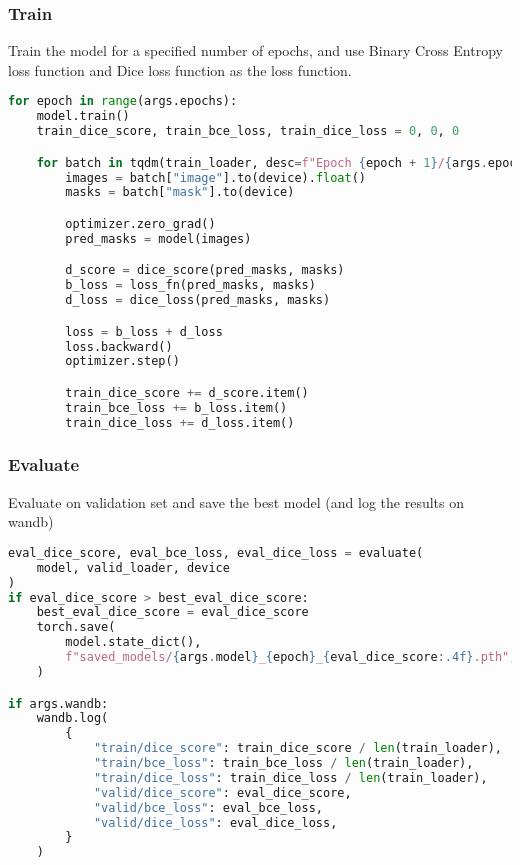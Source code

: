 \subsubsection{Train}
Train the model for a specified number of epochs, and use Binary Cross Entropy loss function and Dice loss function as the loss function.
\begin{lstlisting}[language=Python, caption=train.py: Train, label=lst:train_train]
for epoch in range(args.epochs):
    model.train()
    train_dice_score, train_bce_loss, train_dice_loss = 0, 0, 0

    for batch in tqdm(train_loader, desc=f"Epoch {epoch + 1}/{args.epochs}"):
        images = batch["image"].to(device).float()
        masks = batch["mask"].to(device)

        optimizer.zero_grad()
        pred_masks = model(images)

        d_score = dice_score(pred_masks, masks)
        b_loss = loss_fn(pred_masks, masks)
        d_loss = dice_loss(pred_masks, masks)

        loss = b_loss + d_loss
        loss.backward()
        optimizer.step()

        train_dice_score += d_score.item()
        train_bce_loss += b_loss.item()
        train_dice_loss += d_loss.item()
\end{lstlisting}

\subsubsection{Evaluate}
Evaluate on validation set and save the best model (and log the results on wandb)

\begin{lstlisting}[language=Python, caption=train.py: Evaluate, label=lst:train_evaluate]
eval_dice_score, eval_bce_loss, eval_dice_loss = evaluate(
    model, valid_loader, device
)
if eval_dice_score > best_eval_dice_score:
    best_eval_dice_score = eval_dice_score
    torch.save(
        model.state_dict(),
        f"saved_models/{args.model}_{epoch}_{eval_dice_score:.4f}.pth",
    )

if args.wandb:
    wandb.log(
        {
            "train/dice_score": train_dice_score / len(train_loader),
            "train/bce_loss": train_bce_loss / len(train_loader),
            "train/dice_loss": train_dice_loss / len(train_loader),
            "valid/dice_score": eval_dice_score,
            "valid/bce_loss": eval_bce_loss,
            "valid/dice_loss": eval_dice_loss,
        }
    )
\end{lstlisting}

